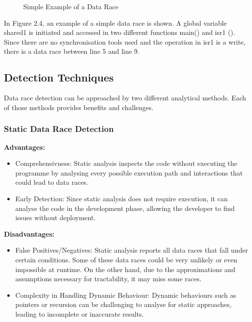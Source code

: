 \documentclass[
fancyheadings, %
%
%
]{stsreprt}
\begin{document}
{\begin{figure}[H]
\begin{algorithm}[H]
				\BlankLine
				
				\BlankLine
			\end{algorithm}
			\caption{Simple Example of a Data Race}
		\end{figure}
		
		In Figure 2.4, an example of a simple data race is shown. A global variable shared1 is initiated and accessed in two different functions main() and isr1 (). Since there are no synchronisation tools used and the operation in isr1 is a write, there is a data race between line 5 and line 9.
		
		
		\subsection{Detection Techniques}
		
		Data race detection can be approached by two different analytical methods. Each of those methods provides benefits and challenges.
		
		\subsubsection{Static Data Race Detection \cite{wang2020}}
		\textbf{Advantages:}
		\begin{itemize}
			\item Comprehensivness: Static analysis inspects the code without executing the programme by analysing every possible execution path and interactions that could lead to data races. 
			\item Early Detection: Since static analysis does not require execution, it can analyse the code in the development phase, allowing the developer to find issues without deployment.
		\end{itemize}
		\textbf{Disadvantages:}
		\begin{itemize}
			\item False Positives/Negatives: Static analysis reports all data races that fall under certain conditions. Some of these data races could be very unlikely or even impossible at runtime. On the other hand, due to the approximations and assumptions necessary for tractability, it may miss some races.
			\item Complexity in Handling Dynamic Behaviour: Dynamic behaviours such as pointers or recursion can be challenging to analyse for static approaches, leading to incomplete or inaccurate results.
		\end{itemize}
		
}
\end{document}
